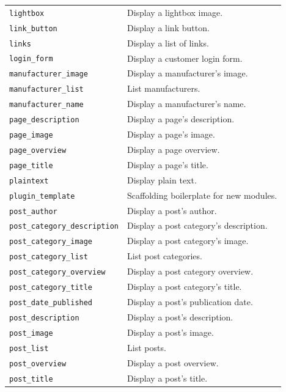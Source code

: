 \documentclass[11pt,a4paper]{article}
\begin{document}
\begin{longtable}{p{5.5cm}p{7.0cm}}
\texttt{lightbox}                & Display a lightbox image. \\
\texttt{link\_button}            & Display a link button. \\
\texttt{links}                   & Display a list of links. \\
\texttt{login\_form}             & Display a customer login form. \\
\texttt{manufacturer\_image}     & Display a manufacturer's image. \\
\texttt{manufacturer\_list}      & List manufacturers. \\
\texttt{manufacturer\_name}      & Display a manufacturer's name. \\
\texttt{page\_description}       & Display a page's description. \\
\texttt{page\_image}             & Display a page's image. \\
\texttt{page\_overview}          & Display a page overview. \\
\texttt{page\_title}             & Display a page's title. \\
\texttt{plaintext}               & Display plain text. \\
\texttt{plugin\_template}        & Scaffolding boilerplate for new modules. \\
\texttt{post\_author}            & Display a post's author. \\
\texttt{post\_category\_description} & Display a post category's description. \\
\texttt{post\_category\_image}   & Display a post category's image. \\
\texttt{post\_category\_list}    & List post categories. \\
\texttt{post\_category\_overview} & Display a post category overview. \\
\texttt{post\_category\_title}   & Display a post category's title. \\
\texttt{post\_date\_published}   & Display a post's publication date. \\
\texttt{post\_description}       & Display a post's description. \\
\texttt{post\_image}             & Display a post's image. \\
\texttt{post\_list}              & List posts. \\
\texttt{post\_overview}          & Display a post overview. \\
\texttt{post\_title}             & Display a post's title. \\

\end{longtable}
\end{document}
